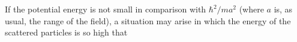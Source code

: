 If the potential energy is not small in comparison with $\hbar^2/ma^2$ (where $a$ is, as usual, the range of the field), a situation may arise in which the energy of the scattered particles is so high that
